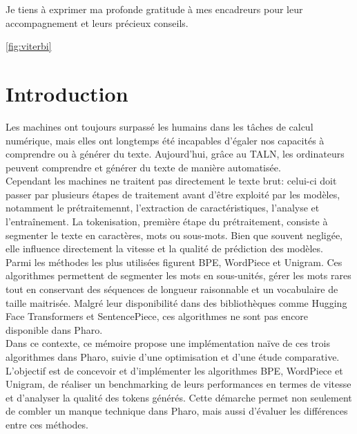 \documentclass[12pt,a4paper]{report}
\begin{document}
	Je tiens à exprimer ma profonde gratitude à mes encadreurs
	pour leur accompagnement et leurs précieux conseils.
	
	\clearpage
	
	\listoffigures
	\ref{fig:viterbi}
	
	\clearpage
	
	\tableofcontents
	\clearpage
	
	
	
	\chapter*{Introduction}
	Les machines ont toujours surpassé les humains dans les tâches de calcul numérique, mais elles ont longtemps été incapables d'égaler nos capacités à comprendre ou à générer du texte. Aujourd'hui, grâce au TALN, les ordinateurs peuvent comprendre et générer du texte de manière automatisée.\\
	Cependant les machines ne traitent pas directement le texte brut: celui-ci doit passer par plusieurs étapes de traitement avant d'être exploité par les modèles, notamment le prétraitemennt, l'extraction de caractéristiques, l'analyse et l'entraînement. La tokenisation, première étape du prétraitement, consiste à segmenter le texte en caractères, mots ou sous-mots. Bien que souvent negligée, elle influence directement la vitesse et la qualité de prédiction des modèles.\\
	Parmi les méthodes les plus utilisées figurent BPE, WordPiece et Unigram. Ces algorithmes permettent de segmenter les mots en sous-unités, gérer les mots rares tout en conservant des séquences de longueur raisonnable et un vocabulaire de taille maitrisée. Malgré leur disponibilité dans des bibliothèques comme Hugging Face Transformers et SentencePiece, ces algorithmes ne sont pas encore disponible dans Pharo.\\
	Dans ce contexte, ce mémoire propose une implémentation naïve de  ces trois algorithmes dans Pharo, suivie d'une optimisation et d'une étude comparative. L'objectif est de concevoir et d'implémenter les algorithmes BPE, WordPiece et Unigram, de réaliser un benchmarking de leurs performances en termes de vitesse et d'analyser la qualité des tokens générés. Cette démarche permet non seulement de combler un manque technique dans Pharo, mais aussi d'évaluer les différences entre ces méthodes.\\
\end{document}
